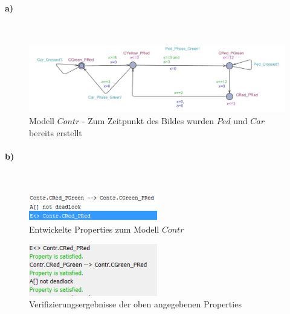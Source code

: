 

\paragraph{a)}\mbox{} \\

\begin{figure}[H] 
	\centering 
	\includegraphics[width=\textwidth]{./UPAAAL_Screens/Contr1}
	\caption[Aufgabe 2a)]{Modell $Contr$ - Zum Zeitpunkt des Bildes wurden $Ped$ und $Car$ bereits erstellt}    
\end{figure}

\paragraph{b)}\mbox{} \\


\begin{figure}[H] 
	\centering 
	\includegraphics[width=0.5\textwidth]{./UPAAAL_Screens/2b_Verify}
	\caption[Aufgabe 2b)]{Entwickelte Properties zum Modell $Contr$}    
\end{figure}

\begin{figure}[H] 
	\centering 
	\includegraphics[width=0.5\textwidth]{./UPAAAL_Screens/2b_Ergebnisse}
	\caption[Aufgabe 2b)]{Verifizierungsergebnisse der oben angegebenen Properties}    
\end{figure}

